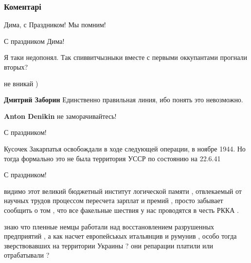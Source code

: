  
 
 
 
 
\subsubsection{Коментарі}
\label{sec:28_10_2021.fb.zaborin_dmitrij.1.den_osvobozhdenia_ukrainy.cmt}

\begin{itemize} %
Дима, с Праздником! Мы помним!

С праздником Дима!

Я таки недопонял. Так спиввитчызныки вместе с первыми оккупантами прогнали вторых?

\begin{itemize} %
не вникай )

\textbf{Дмитрий Заборин} Единственно правильная линия, ибо понять это невозможно.

\textbf{Anton Denikin} не заморачивайтесь!
\end{itemize} %

С праздником!


Кусочек Закарпатья освобождали в ходе следующей операции, в ноябре 1944. Но
тогда формально это не была территория УССР по состоянию на 22.6.41

С праздником!


видимо этот великий бюджетный институт логической памяти , отвлекаемый от
научных трудов процессом пересчета зарплат и премий , просто забывает сообщить
о том , что все факельные шествия у нас проводятся в честь РККА .



знаю что пленные немцы работали над восстановлением разрушенных предприятий , а
как насчет европейськых итальянцив и румунив , особо тогда зверствовавших на
территории Украины ? они репарации платили или отрабатывали ?


\end{itemize}
